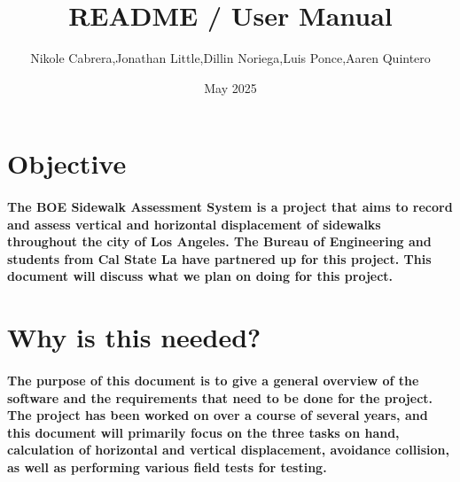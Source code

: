 \documentclass{article}
\title{README / User Manual}
\author{Nikole Cabrera,Jonathan Little,Dillin Noriega,Luis Ponce,Aaren Quintero}
\date{May 2025}
\begin{document}
\maketitle

\section{Objective}

\paragraph{The BOE Sidewalk Assessment System is a project that aims to record and assess vertical and horizontal
displacement of sidewalks throughout the city of Los Angeles. The Bureau of Engineering and students
from Cal State La have partnered up for this project. This document will discuss what we plan on doing
for this project.}

\section{Why is this needed?}

\paragraph{The purpose of this document is to give a general overview of the software and the requirements that
need to be done for the project. The project has been worked on over a course of several years, and this
document will primarily focus on the three tasks on hand, calculation of horizontal and vertical
displacement, avoidance collision, as well as performing various field tests for testing.}
\end{document}
